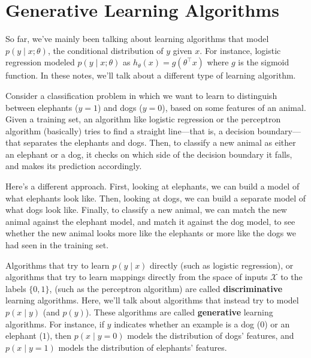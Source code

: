\titlespacing*{\part}{0pt}{-20pt}{30pt} %
\titlespacing*{\chapter}{0pt}{-10pt}{30pt}

\part{Generative Learning Algorithms}
\label{part:generative_algs}


So far, we've mainly been talking about learning algorithms that model
$p(y \mid x;\theta)$, the conditional distribution of $y$ given $x$. For instance, logistic
regression modeled $p(y \mid x;\theta)$ as $h_\theta (x) = g(\theta^\top x)$ where $g$ is the sigmoid function.
In these notes, we'll talk about a different type of learning algorithm.

Consider a classification problem in which we want to learn to distinguish
between elephants ($y = 1$) and dogs ($y = 0$), based on some features of
an animal. Given a training set, an algorithm like logistic regression or
the perceptron algorithm (basically) tries to find a straight line---that is, a
decision boundary---that separates the elephants and dogs. Then, to classify
a new animal as either an elephant or a dog, it checks on which side of the
decision boundary it falls, and makes its prediction accordingly.

Here's a different approach. First, looking at elephants, we can build a
model of what elephants look like. Then, looking at dogs, we can build a
separate model of what dogs look like. Finally, to classify a new animal, we
can match the new animal against the elephant model, and match it against
the dog model, to see whether the new animal looks more like the elephants
or more like the dogs we had seen in the training set.

Algorithms that try to learn $p(y \mid x)$ directly (such as logistic regression),
or algorithms that try to learn mappings directly from the space of inputs $\mathcal X$
to the labels $\{0,1\}$, (such as the perceptron algorithm) are called \textbf{discriminative}
learning algorithms. Here, we'll talk about algorithms that instead
try to model $p(x \mid y)$ (and $p(y)$). These algorithms are called \textbf{generative}
learning algorithms. For instance, if $y$ indicates whether an example is a
dog ($0$) or an elephant ($1$), then $p(x \mid y = 0)$ models the distribution of dogs'
features, and $p(x \mid y = 1)$ models the distribution of elephants' features.

